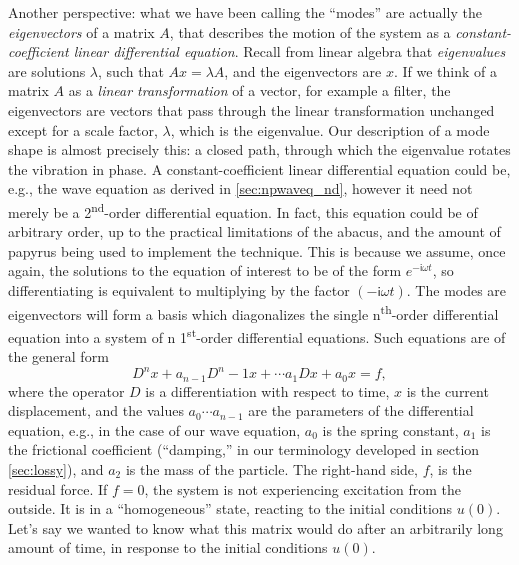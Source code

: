 \documentclass[a4paper,10pt]{report}
\numberwithin{equation}{section}
\begin{document}
Another perspective: what we have been calling the ``modes'' are actually the \emph{eigenvectors} of a matrix $A$, that describes the motion of the system as a \emph{constant-coefficient linear differential equation}. Recall from linear algebra that \emph{eigenvalues} are solutions $\lambda$, such that $Ax = \lambda A$, and the eigenvectors are $x$.\cite[p.~283]{Strang2009} If we think of a matrix $A$ as a \emph{linear transformation} of a vector, for example a filter, the eigenvectors are vectors that pass through the linear transformation unchanged except for a scale factor, $\lambda$, which is the eigenvalue. Our description of a mode shape is almost precisely this: a closed path, through which the eigenvalue rotates the vibration in phase. \cite[p.~8]{Marshall2004} A constant-coefficient linear differential equation could be, e.g., the wave equation as derived in \ref{sec:npwaveq_nd}, however it need not merely be a 2\textsuperscript{nd}-order differential equation. In fact, this equation could be of 
arbitrary order, up to the practical limitations of the abacus, and the amount of papyrus being used to implement the technique. This is because we assume, once again, the solutions to the equation of interest to be of the form $e^{-\mathsf{i}\omega t}$, so differentiating is equivalent to multiplying by the factor $(-\mathsf{i}\omega t)$. The modes are eigenvectors will form a basis which diagonalizes the single n\textsuperscript{th}-order differential equation into a system of n 1\textsuperscript{st}-order differential equations. Such equations are of the general form\cite[p.~16]{Reid1992}
\begin{equation}
D^n x + a_{n-1} D^n-1 x + \cdots a_1 Dx + a_0 x = f ,
\end{equation}
where the operator $D$ is a differentiation with respect to time, $x$ is the current displacement, and the values $a_0 \cdots a_{n-1}$ are the parameters of the differential equation, e.g., in the case of our wave equation, $a_0$ is the spring constant, $a_1$ is the frictional coefficient (``damping,'' in our terminology developed in section \ref{sec:lossy}), and $a_2$ is the mass of the particle. The right-hand side, $f$, is the residual force. If $f=0$, the system is not experiencing excitation from the outside. It is in a ``homogeneous'' state, reacting to the initial conditions $u(0)$. Let's say we wanted to know what this matrix would do after an arbitrarily long amount of time, in response to the initial conditions $u(0)$. 
\end{document}
